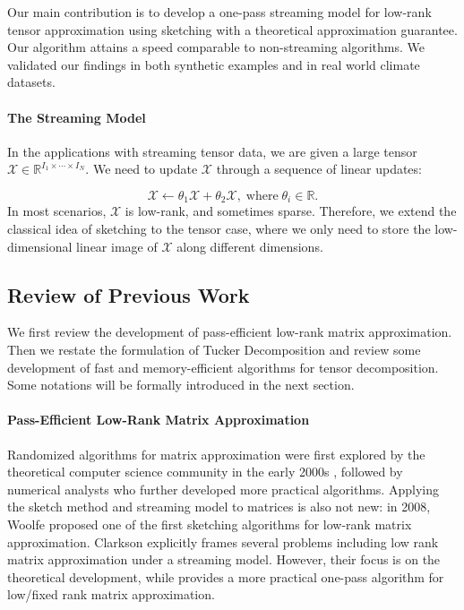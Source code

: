 Our main contribution is to develop a one-pass streaming model for low-rank tensor approximation using sketching with a theoretical approximation guarantee. Our algorithm attains a speed comparable to non-streaming algorithms. We validated our findings in both synthetic examples and in real world climate datasets. 
 
\paragraph{The Streaming Model} In the applications with streaming tensor data, we are given a large tensor $\mathscr{X} \in \mathbb{R}^{I_1 \times \cdots \times I_N}$. We need to update $\mathscr{X}$ through a sequence of linear updates: 

\begin{equation}
    \mathscr{X} \leftarrow \theta_1\mathscr{X} + \theta_2\mathscr{X}, \; \text{where} \; \theta_i \in \mathbb{R}. 
\end{equation}
In most scenarios, $\mathscr{X}$ is low-rank, and sometimes sparse. Therefore, we extend the classical idea of sketching to the tensor case, where we only need to store the low-dimensional linear image of $\mathscr{X}$ along different dimensions.

\subsection{Review of Previous Work}
We first review the development of pass-efficient low-rank matrix approximation. Then we restate the formulation of Tucker Decomposition and review some development of fast and memory-efficient algorithms for tensor decomposition. Some notations will be formally introduced in the next section. 


\paragraph{Pass-Efficient Low-Rank Matrix Approximation} Randomized algorithms for matrix approximation were first explored by the theoretical computer science community in the early 2000s \citep{frieze2004fast, papadimitriou2000latent}, followed by numerical analysts who further developed more practical algorithms. Applying the sketch method and streaming model to matrices is also not new: in 2008, Woolfe \cite{woolfe2008fast} proposed one of the first sketching algorithms for low-rank matrix approximation. Clarkson \cite{clarkson2009numerical} explicitly frames several problems including low rank matrix approximation under a streaming model. However, their focus is on the theoretical development, while \cite{tropp2017practical} provides a more practical one-pass algorithm for low/fixed rank matrix approximation. 

